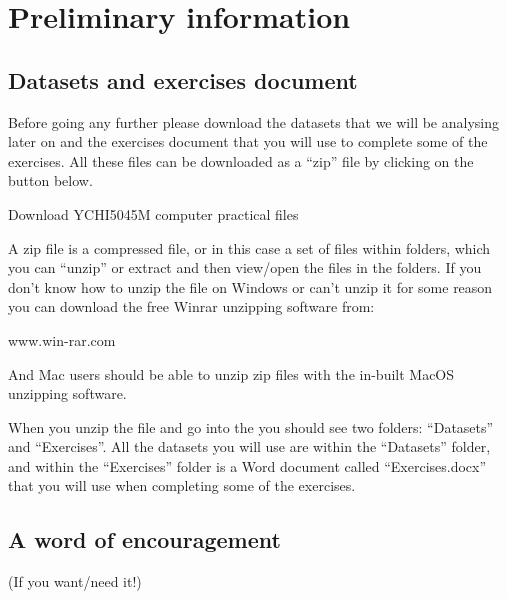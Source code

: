\documentclass[
]{book}
\begin{document}
\hypertarget{preliminary-information}{%
\chapter{Preliminary information}\label{preliminary-information}}

\hypertarget{datasets-and-exercises-document}{%
\section{Datasets and exercises document}\label{datasets-and-exercises-document}}

Before going any further please download the datasets that we will be analysing later on and the exercises document that you will use to complete some of the exercises. All these files can be downloaded as a ``zip'' file by clicking on the button below.

Download YCHI5045M computer practical files

A zip file is a compressed file, or in this case a set of files within folders, which you can ``unzip'' or extract and then view/open the files in the folders. If you don't know how to unzip the file on Windows or can't unzip it for some reason you can download the free Winrar unzipping software from:

www.win-rar.com

And Mac users should be able to unzip zip files with the in-built MacOS unzipping software.

When you unzip the file and go into the you should see two folders: ``Datasets'' and ``Exercises''. All the datasets you will use are within the ``Datasets'' folder, and within the ``Exercises'' folder is a Word document called ``Exercises.docx'' that you will use when completing some of the exercises.

\hypertarget{a-word-of-encouragement}{%
\section{A word of encouragement}\label{a-word-of-encouragement}}

(If you want/need it!)
\end{document}
